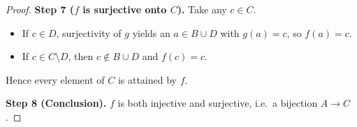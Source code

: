 \documentclass[12pt]{article}
\theoremstyle{definition} %
\theoremstyle{plain} %
\begin{document}
\begin{proof}
      \medskip
      \textbf{Step 7 ($f$ is surjective onto $C$).}
      Take any $c\in C$.
      
      \begin{itemize}
        \item If $c\in D$, surjectivity of $g$ yields an $a\in B\cup D$
              with $g(a)=c$, so $f(a)=c$.
        \item If $c\in C\setminus D$, then $c\notin B\cup D$
              and $f(c)=c$.
      \end{itemize}
      Hence every element of $C$ is attained by $f$.
      
      \medskip
      \textbf{Step 8 (Conclusion).}
      $f$ is both injective and surjective, i.e.\ a bijection $A\to C$.
      \end{proof}
\end{document}
